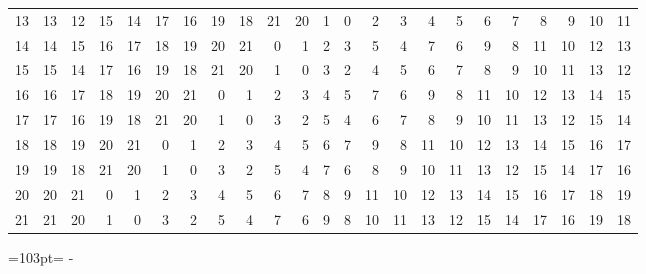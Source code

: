 \documentclass[10pt,a4paper]{article}
\newcommand{\needspace}[1]{\par\penalty-100\begingroup\dimen0=#1\relax\dimen2=\pagegoal
  \advance\dimen2-\pagetotal\ifdim\dimen0>\dimen2\relax\ifdim\dimen2>0pt\vfil\break\fi\fi
  \endgroup}
\numberwithin{equation}{section}
\begin{document}
{\begin{longtable}{@{}r|rrrrrrrrrrrrrrrrrrrrrr@{}}
13 & 13 & 12 & 15 & 14 & 17 & 16 & 19 & 18 & 21 & 20 & 1 & 0 & 2 & 3 & 4 & 5 & 6 & 7 & 8 & 9 & 10 & 11\\
14 & 14 & 15 & 16 & 17 & 18 & 19 & 20 & 21 & 0 & 1 & 2 & 3 & 5 & 4 & 7 & 6 & 9 & 8 & 11 & 10 & 12 & 13\\
15 & 15 & 14 & 17 & 16 & 19 & 18 & 21 & 20 & 1 & 0 & 3 & 2 & 4 & 5 & 6 & 7 & 8 & 9 & 10 & 11 & 13 & 12\\
16 & 16 & 17 & 18 & 19 & 20 & 21 & 0 & 1 & 2 & 3 & 4 & 5 & 7 & 6 & 9 & 8 & 11 & 10 & 12 & 13 & 14 & 15\\
17 & 17 & 16 & 19 & 18 & 21 & 20 & 1 & 0 & 3 & 2 & 5 & 4 & 6 & 7 & 8 & 9 & 10 & 11 & 13 & 12 & 15 & 14\\
18 & 18 & 19 & 20 & 21 & 0 & 1 & 2 & 3 & 4 & 5 & 6 & 7 & 9 & 8 & 11 & 10 & 12 & 13 & 14 & 15 & 16 & 17\\
19 & 19 & 18 & 21 & 20 & 1 & 0 & 3 & 2 & 5 & 4 & 7 & 6 & 8 & 9 & 10 & 11 & 13 & 12 & 15 & 14 & 17 & 16\\
20 & 20 & 21 & 0 & 1 & 2 & 3 & 4 & 5 & 6 & 7 & 8 & 9 & 11 & 10 & 12 & 13 & 14 & 15 & 16 & 17 & 18 & 19\\*
21 & 21 & 20 & 1 & 0 & 3 & 2 & 5 & 4 & 7 & 6 & 9 & 8 & 10 & 11 & 13 & 12 & 15 & 14 & 17 & 16 & 19 & 18\\
\bottomrule\end{longtable}}
\needspace{103pt}
\end{document}
